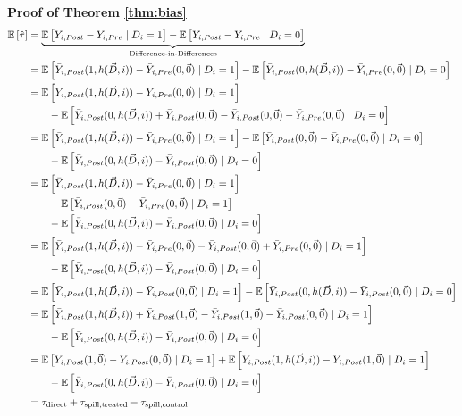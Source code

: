 \documentclass[11pt]{article}
\begin{document}
\textbf{Proof of Theorem \ref{thm:bias}}
\begin{align*}
    \mathbb{E}\left[\hat{\tau} \right] &= \underbrace{\mathbb{E}\left[\bar{Y}_{i,Post} - \bar{Y}_{i,Pre} \mid D_i = 1 \right] - \mathbb{E}\left[\bar{Y}_{i,Post} - \bar{Y}_{i,Pre} \mid D_i = 0 \right]}_{\text{Difference-in-Differences}} \\
    &= \mathbb{E}\left[\bar{Y}_{i,Post}(1, h(\vec{D}, i)) - \bar{Y}_{i,Pre}(0, \vec{0})  \mid D_i = 1 \right] - \mathbb{E}\left[\bar{Y}_{i,Post}(0, h(\vec{D}, i)) - \bar{Y}_{i,Pre}(0, \vec{0}) \mid D_i = 0 \right] \\
    &= \mathbb{E}\left[\bar{Y}_{i,Post}(1, h(\vec{D}, i)) - \bar{Y}_{i,Pre}(0, \vec{0})  \mid D_i = 1 \right] \\
    &\quad\quad - \mathbb{E}\left[\bar{Y}_{i,Post}(0, h(\vec{D}, i)) + \bar{Y}_{i,Post}(0, \vec{0}) - \bar{Y}_{i,Post}(0, \vec{0}) - \bar{Y}_{i,Pre}(0, \vec{0}) \mid D_i = 0 \right] \\
    &= \mathbb{E}\left[\bar{Y}_{i,Post}(1, h(\vec{D}, i)) - \bar{Y}_{i,Pre}(0, \vec{0})  \mid D_i = 1 \right] - \mathbb{E}\left[\bar{Y}_{i,Post}(0, \vec{0}) - \bar{Y}_{i,Pre}(0, \vec{0}) \mid D_i = 0\right] \\ 
    &\quad\quad - \mathbb{E}\left[\bar{Y}_{i,Post}(0, h(\vec{D}, i)) - \bar{Y}_{i,Post}(0, \vec{0})\mid D_i = 0\right] \\ 
    &= \mathbb{E}\left[\bar{Y}_{i,Post}(1, h(\vec{D}, i)) - \bar{Y}_{i,Pre}(0, \vec{0})  \mid D_i = 1 \right] \\
    &\quad\quad - \mathbb{E}\left[\bar{Y}_{i,Post}(0, \vec{0}) - \bar{Y}_{i,Pre}(0, \vec{0}) \mid D_i = 1\right] \\
    &\quad\quad - \mathbb{E}\left[\bar{Y}_{i,Post}(0, h(\vec{D}, i)) - \bar{Y}_{i,Post}(0, \vec{0})\mid D_i = 0\right] \\  
    &= \mathbb{E}\left[\bar{Y}_{i,Post}(1, h(\vec{D}, i)) - \bar{Y}_{i,Pre}(0, \vec{0}) - \bar{Y}_{i,Post}(0, \vec{0}) + \bar{Y}_{i,Pre}(0, \vec{0})\mid D_i = 1 \right] \\
    &\quad\quad - \mathbb{E}\left[\bar{Y}_{i,Post}(0, h(\vec{D}, i)) - \bar{Y}_{i,Post}(0, \vec{0})\mid D_i = 0\right]\\
    &= \mathbb{E}\left[\bar{Y}_{i,Post}(1, h(\vec{D}, i)) - \bar{Y}_{i,Post}(0, \vec{0}) \mid D_i = 1 \right] - \mathbb{E}\left[\bar{Y}_{i,Post}(0, h(\vec{D}, i)) - \bar{Y}_{i,Post}(0, \vec{0})\mid D_i = 0\right]\\
    &= \mathbb{E}\left[\bar{Y}_{i,Post}(1, h(\vec{D}, i)) + \bar{Y}_{i,Post}(1, \vec{0}) - \bar{Y}_{i,Post}(1, \vec{0}) - \bar{Y}_{i,Post}(0, \vec{0})\mid D_i = 1 \right] \\
    &\quad\quad - \mathbb{E}\left[\bar{Y}_{i,Post}(0, h(\vec{D}, i)) - \bar{Y}_{i,Post}(0, \vec{0})\mid D_i = 0\right] \\
    &= \mathbb{E}\left[\bar{Y}_{i,Post}(1, \vec{0}) - \bar{Y}_{i,Post}(0, \vec{0}) \mid D_i = 1\right] + \mathbb{E}\left[\bar{Y}_{i,Post}(1, h(\vec{D}, i)) - \bar{Y}_{i,Post}(1, \vec{0}) \mid D_i = 1\right] \\
    &\quad\quad - \mathbb{E}\left[\bar{Y}_{i,Post}(0, h(\vec{D}, i)) - \bar{Y}_{i,Post}(0, \vec{0}) \mid D_i = 0\right] \\
    &= \tau_{\text{direct}} + \tau_{\text{spill,treated}} - \tau_{\text{spill,control}} \\
\end{align*}
\end{document}

